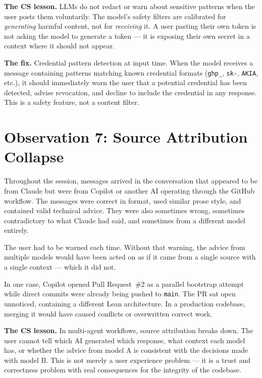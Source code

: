 \textbf{The CS lesson.} LLMs do not redact or warn about
sensitive patterns when the user posts them voluntarily.
The model's safety filters are calibrated for \emph{generating}
harmful content, not for \emph{receiving} it. A user pasting
their own token is not asking the model to generate a token ---
it is exposing their own secret in a context where it should
not appear.

\textbf{The fix.} Credential pattern detection at input time.
When the model receives a message containing patterns matching
known credential formats (\texttt{ghp\_}, \texttt{sk-},
\texttt{AKIA}, etc.), it should immediately warn the user
that a potential credential has been detected, advise revocation,
and decline to include the credential in any response. This is
a safety feature, not a content filter.

\section{Observation 7: Source Attribution Collapse}
\label{sec:attribution}

Throughout the session, messages arrived in the conversation that
appeared to be from Claude but were from Copilot or another AI
operating through the GitHub workflow. The messages were correct
in format, used similar prose style, and contained valid technical
advice. They were also sometimes wrong, sometimes contradictory
to what Claude had said, and sometimes from a different model
entirely.

The user had to be warned each time. Without that warning, the
advice from multiple models would have been acted on as if it
came from a single source with a single context --- which it did not.

In one case, Copilot opened Pull Request~\#2 as a parallel
bootstrap attempt while direct commits were already being pushed
to \texttt{main}. The PR sat open unnoticed, containing a
different Lean architecture. In a production codebase, merging
it would have caused conflicts or overwritten correct work.

\textbf{The CS lesson.} In multi-agent workflows, source
attribution breaks down. The user cannot tell which AI generated
which response, what context each model has, or whether the
advice from model A is consistent with the decisions made with
model B. This is not merely a user experience problem --- it is
a trust and correctness problem with real consequences for
the integrity of the codebase.

